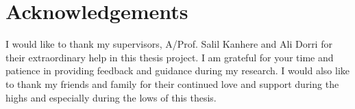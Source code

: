 \chapter*{Acknowledgements}\label{ack}

I would like to thank my supervisors, A/Prof. Salil Kanhere and Ali Dorri for their extraordinary help in this thesis project. I am grateful for your time and patience in providing feedback and guidance during my research. I would also like to thank my friends and family for their continued love and support during the highs and especially during the lows of this thesis. 
